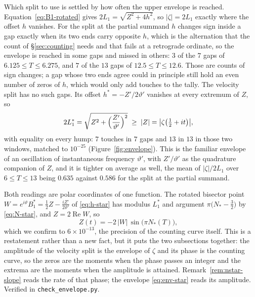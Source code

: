 \documentclass[11pt]{article}
\theoremstyle{definition}
\begin{document}
Which split to use is settled by how often the upper envelope is reached.
Equation~\eqref{eq:B1-rotated} gives $2L_1=\sqrt{Z^2+4h^2}$, so $|\zeta|=2L_1$
exactly where the offset $h$ vanishes. For the split at the partial
summand $h$ changes sign inside a gap exactly when its two ends carry opposite
$h$, which
is the alternation that the count of \S\ref{sec:counting} needs and that fails at
a retrograde ordinate, so the envelope is reached in some gaps and missed in
others: $3$ of the $7$ gaps of $6.125\leq T\leq6.275$, and $7$ of the $13$ gaps
of $12.5\leq T\leq12.6$. Those are counts of sign changes; a gap whose two ends
agree could in principle still hold an even number of zeros of $h$, which would
only add touches to the tally. The velocity split has no such gaps. Its offset
$h^{\ast}=-Z'/2\vartheta'$ vanishes at every extremum of $Z$, so
\begin{equation}\label{eq:env-star}
2L_1^{\ast}=\sqrt{Z^2+\Bigl(\frac{Z'}{\vartheta'}\Bigr)^{2}}
\;\geq\;|Z|=\bigl|\zeta\bigl(\tfrac12+it\bigr)\bigr| ,
\end{equation}
with equality on every hump: $7$ touches in $7$ gaps and $13$ in $13$ in those
two windows, matched to $10^{-25}$ (Figure~\ref{fig:envelope}). This is the familiar envelope of an
oscillation of instantaneous frequency $\vartheta'$, with $Z'/\vartheta'$ as the
quadrature companion of $Z$, and it is tighter on average as well, the mean of
$|\zeta|/2L_1$ over $6\leq T\leq13$ being $0.635$ against $0.586$ for the split
at the partial summand.

Both readings are polar coordinates of one function. The rotated bisector point
$W=e^{i\vartheta}B_1^{\ast}=\tfrac12Z-\tfrac{iZ'}{2\vartheta'}$ of \eqref{eq:h-star}
has modulus $L_1^{\ast}$ and argument $\pi\bigl(N_{\ast}-\tfrac32\bigr)$ by
\eqref{eq:N-star}, and $Z=2\operatorname{Re}W$, so
\begin{equation}\label{eq:Z-polar}
Z(t)=-2\,|W|\,\sin\bigl(\pi N_{\ast}(T)\bigr),
\end{equation}
which we confirm to $6\times10^{-13}$, the precision of the counting curve
itself. This is a restatement rather than a new fact, but it puts the two
subsections together: the amplitude of the velocity split is the envelope of
$\zeta$ and its phase is the counting curve, so the zeros are the moments when
the phase passes an integer and the extrema are the moments when the amplitude
is attained. Remark~\ref{rem:nstar-slope} reads the rate of that phase; the
envelope \eqref{eq:env-star} reads its amplitude. Verified in
\texttt{check\_envelope.py}.
\end{document}
